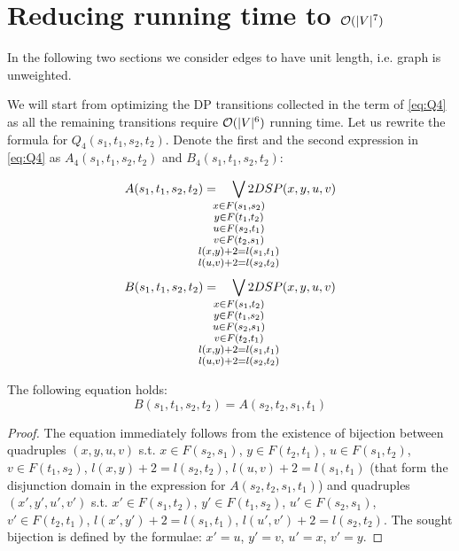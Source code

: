 \section{Reducing running time to $\mathcal{O}(|V|^7)$}

In the following two sections we consider edges to have unit length, i.e. graph is unweighted.

We will start from optimizing the DP transitions collected in the term of \eqref{eq:Q4} as all the remaining transitions require $\mathcal{O}(|V|^6)$ running time. Let us rewrite the formula for $Q_4(s_1, t_1, s_2, t_2)$. Denote the first and the second expression in \eqref{eq:Q4} as $A_4(s_1, t_1, s_2, t_2)$ and $B_4(s_1, t_1, s_2, t_2)$:

\begin{equation} \label{eq:A} 
    A(s_1, t_1, s_2, t_2) = \quad
        \smashoperator{\bigvee_{
        \large \substack{
            x \in F(s_1, s_2)\\ 
            y \in F(t_1, t_2)\\ 
            u \in F(s_2, t_1)\\ 
            v \in F(t_2, s_1)\\ 
            l(x, y) + 2 = l(s_1, t_1)\\ 
            l(u, v) + 2 = l(s_2, t_2)
        }
        }} 2DSP(x, y, u, v)
\end{equation}
\begin{equation} \label{eq:B}
   B(s_1, t_1, s_2, t_2) = \quad
        \smashoperator{\bigvee_{
        \large \substack{
            x \in F(s_1, t_2)\\ 
            y \in F(t_1, s_2)\\ 
            u \in F(s_2, s_1)\\ 
            v \in F(t_2, t_1)\\ 
            l(x, y) + 2 = l(s_1, t_1)\\ 
            l(u, v) + 2 = l(s_2, t_2)
        }
        }} 2DSP(x, y, u, v)
\end{equation}
\begin{proposition}
The following equation holds:
\begin{equation}
    B(s_1, t_1, s_2, t_2) = A(s_2, t_2, s_1, t_1)
\end{equation}
\end{proposition}
\begin{proof}
The equation immediately follows from the existence of bijection between quadruples $(x, y, u, v)$ s.t. $x \in F(s_2, s_1)$, $y \in F(t_2, t_1)$, $u \in F(s_1, t_2)$, $v \in F(t_1, s_2)$, $l(x, y) + 2 = l(s_2, t_2)$, $l(u, v) + 2 = l(s_1, t_1)$ (that form the disjunction domain in the expression for $A(s_2, t_2, s_1, t_1)$) and quadruples $(x', y', u', v')$ s.t. $x' \in F(s_1, t_2)$, $y' \in F(t_1, s_2)$, $u' \in F(s_2, s_1)$, $v' \in F(t_2, t_1)$, $l(x', y') + 2 = l(s_1, t_1)$, $l(u', v') + 2 = l(s_2, t_2)$. The sought bijection is defined by the formulae: $x' = u$, $y' = v$, $u' = x$, $v' = y$.
\end{proof}

